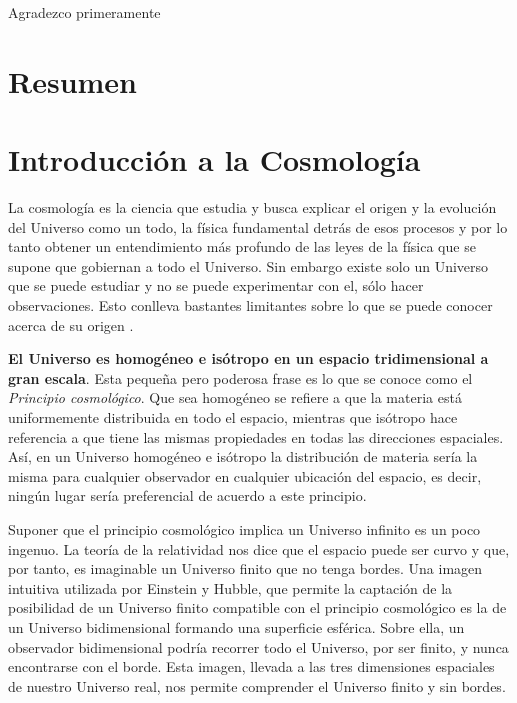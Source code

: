 \documentclass[a4paper,openright,12pt]{book}
\begin{document}
Agradezco primeramente 

\chapter*{Resumen} %

\tableofcontents %

\cleardoublepage
{} %
\listoffigures %

\cleardoublepage
{} %
\listoftables %




\chapter{Introducción a la Cosmología}
La cosmología es la ciencia que estudia y busca explicar el origen y la evolución del Universo como un todo, la física fundamental detrás de esos procesos y por lo tanto obtener un entendimiento más profundo de las leyes de la física que se supone que gobiernan a todo el Universo. Sin embargo existe solo un Universo que se puede estudiar y no se puede  experimentar con el, sólo hacer observaciones. Esto conlleva bastantes limitantes sobre lo que se puede conocer acerca de su origen \cite{1.01}. 

\textbf{El Universo es homogéneo e isótropo en un espacio tridimensional a gran escala}. Esta pequeña pero poderosa frase es lo que se conoce como el \textit{Principio cosmológico}. Que sea homogéneo se refiere a que la materia está uniformemente distribuida en todo el espacio, mientras que isótropo hace referencia a que tiene las mismas propiedades en todas las direcciones espaciales. Así, en un Universo homogéneo e isótropo la distribución de materia sería la misma para cualquier observador en cualquier ubicación del espacio, es decir, ningún lugar sería preferencial de acuerdo a este principio.

Suponer que el principio cosmológico implica un Universo infinito es un poco ingenuo. La teoría de la relatividad nos dice que el espacio puede ser curvo y que, por tanto, es imaginable un Universo finito que no tenga bordes. Una imagen intuitiva utilizada por Einstein y Hubble, que permite la captación de la posibilidad de un Universo finito compatible con el principio cosmológico es la de un Universo bidimensional formando una superficie esférica. Sobre ella, un observador bidimensional podría recorrer todo el Universo, por ser finito, y nunca encontrarse con el borde. Esta imagen, llevada a las tres dimensiones espaciales de nuestro Universo real, nos permite comprender el Universo finito y sin bordes.
\end{document}
